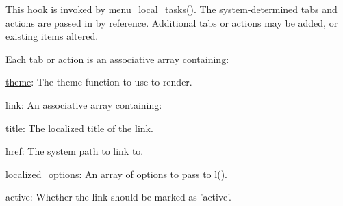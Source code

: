 This hook is invoked by \hyperlink{group__menu_gadb8bb3644e114166950142280085cf3e}{menu\_\-local\_\-tasks()}. The system-\/determined tabs and actions are passed in by reference. Additional tabs or actions may be added, or existing items altered.

Each tab or action is an associative array containing:
\begin{DoxyItemize}
\item \hyperlink{includes_2theme_8inc_a7c25609a935874541a19657affd30fff}{theme}: The theme function to use to render.
\item link: An associative array containing:
\begin{DoxyItemize}
\item title: The localized title of the link.
\item href: The system path to link to.
\item localized\_\-options: An array of options to pass to \hyperlink{common_8inc_ad3b36c06dc46250b8d22b8d0d2e7bd97}{l()}.
\end{DoxyItemize}
\item active: Whether the link should be marked as 'active'.
\end{DoxyItemize}



